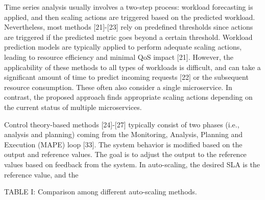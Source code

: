 \documentclass[10pt]{article}
\begin{document}
Time series analysis usually involves a two-step process: workload forecasting is applied, and then scaling actions are triggered based on the predicted workload. Nevertheless, most methods [21]-[23] rely on predefined thresholds since actions are triggered if the predicted metric goes beyond a certain threshold. Workload prediction models are typically applied to perform adequate scaling actions, leading to resource efficiency and minimal QoS impact [21]. However, the applicability of these methods to all types of workloads is difficult, and can take a significant amount of time to predict incoming requests [22] or the subsequent resource consumption. These often also consider a single microservice. In contrast, the proposed approach finds appropriate scaling actions depending on the current status of multiple microservices.

Control theory-based methods [24]-[27] typically consist of two phases (i.e., analysis and planning) coming from the Monitoring, Analysis, Planning and Execution (MAPE) loop [33]. The system behavior is modified based on the output and reference values. The goal is to adjust the output to the reference values based on feedback from the system. In auto-scaling, the desired SLA is the reference value, and the

TABLE I: Comparison among different auto-scaling methods.
\end{document}
